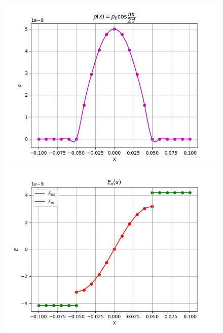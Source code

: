 \documentclass[a4paper,12pt]{article}
\begin{document}
	\begin{figure}[h!]
		\centering
		\begin{minipage}[h]{0.55\linewidth}
			\includegraphics[width=1\linewidth]{Prt sc/Figure_1.jpeg} 
		\end{minipage}
		\begin{minipage}[h]{0.55\linewidth}
			\includegraphics[width=1\linewidth]{Prt sc/Figure_2.jpeg}
		\end{minipage}
		\begin{minipage}[h]{0.55\linewidth}

\end{minipage}
\end{figure}
\end{document}
